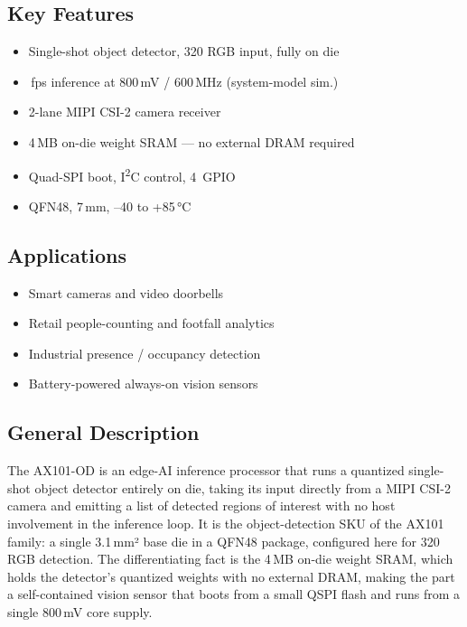 \documentclass{anvil-datasheet}
\begin{document}
\maketitleblock

\begin{featurecolumns}
\subsection*{Key Features}
\begin{itemize}
\item Single-shot object detector, 320 RGB input, fully on die
\item {}\,fps inference at 800\,mV / 600\,MHz (system-model sim.)
\item 2-lane MIPI CSI-2 camera receiver
\item 4\,MB on-die weight SRAM --- no external DRAM required
\item Quad-SPI boot, I\textsuperscript{2}C control, 4\texttimes\ GPIO
\item QFN48, 7\,mm, --40 to +85\,°C
\end{itemize}
\columnbreak
\subsection*{Applications}
\begin{itemize}
\item Smart cameras and video doorbells
\item Retail people-counting and footfall analytics
\item Industrial presence / occupancy detection
\item Battery-powered always-on vision sensors
\end{itemize}
\end{featurecolumns}

\subsection*{General Description}

The AX101-OD is an edge-AI inference processor that runs a quantized single-shot
object detector entirely on die, taking its input directly from a MIPI CSI-2
camera and emitting a list of detected regions of interest with no host
involvement in the inference loop. It is the object-detection SKU of the AX101
family: a single 3.1\,mm² base die in a QFN48 package, configured here for
320 RGB detection. The differentiating fact is the 4\,MB on-die
weight SRAM, which holds the detector's quantized weights with no external DRAM,
making the part a self-contained vision sensor that boots from a small QSPI
flash and runs from a single 800\,mV core supply.
\end{document}
